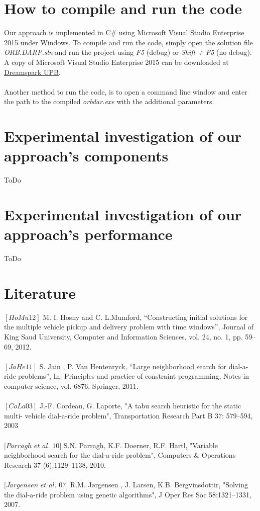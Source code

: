 \documentclass[fleqn]{scrartcl}
\begin{document}
\section{How to compile and run the code}
Our approach is implemented in C\# using Microsoft Visual Studio Enterprise 2015 under Windows. To compile and run the code, simply open the solution file \textit{ORB.DARP.sln} and run the project using \textit{F5} (debug) or \textit{Shift + F5} (no debug).
\\
A copy of Microsoft Visual Studio Enterprise 2015 can be downloaded at \href{https://dreamspark.uni-paderborn.de/}{Dreamspark UPB}.
\\
\\
Another method to run the code, is to open a command line window and enter the path to the compiled \textit{orbdar.exe} with the additional parameters.
\newpage

\section{Experimental investigation of our approach's components}
ToDo
\newpage

\section{Experimental investigation of our approach's performance}
ToDo
\newpage


\section{Literature}
$[HoMu 12]$ M. I. Hosny and C. L.Mumford, “Constructing initial solutions for the multiple vehicle pickup and delivery problem with time windows”, Journal of King Saud University, Computer and Information Sciences, vol. 24, no. 1, pp. 59–69, 2012.
\\
\\
$[JaHe 11]$ S. Jain , P. Van Hentenryck, “Large neighborhood search for dial-a-ride problems”, In: Principles and practice of constraint programming, Notes in computer science, vol. 6876. Springer, 2011.
\\
\\
$[CoLa 03]$ J.-F. Cordeau, G. Laporte, "A tabu search heuristic for the static multi- vehicle dial-a-ride problem", Transportation Research Part B 37: 579–594, 2003
\\
\\
$[Parragh$  $et$  $al.$ $10]$ S.N. Parragh, K.F. Doerner, R.F. Hartl, "Variable neighborhood search for the dial-a-ride problem", Computers \& Operations Research 37 (6),1129–1138, 2010. 
\\
\\
$[Jørgensen$ $et$ $al.$ $07]$ R.M. Jørgensen , J. Larsen, K.B. Bergvinsdottir, "Solving the dial-a-ride problem using genetic algorithms", J Oper Res Soc 58:1321–1331, 2007.
\end{document}
